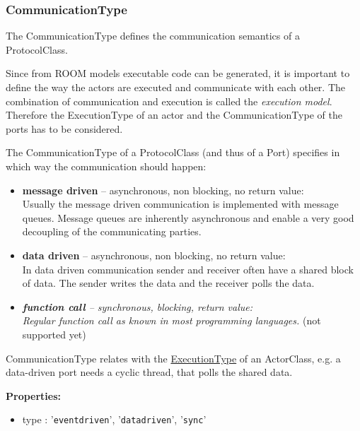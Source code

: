	
	\vspace{\baselineskip}
	\vspace{\baselineskip}
	\vspace{\baselineskip}
	
\subsubsection{CommunicationType}
	\hypertarget{ref:CommunicationType}{}
	The CommunicationType defines the communication semantics of a ProtocolClass.
		
	Since from ROOM models executable code can be generated, it is important to define the way the actors are 
	executed and communicate with each other. The combination of communication and execution is called the 
	\emph{execution model}. Therefore the ExecutionType of an actor and the CommunicationType of the ports has to be considered.
	
	The CommunicationType of a ProtocolClass (and thus of a Port) specifies in which way the communication should happen:
	
	\begin{itemize}
	\item \textbf{message driven} -- asynchronous, non blocking, no return value:\\
	Usually the message driven communication is implemented with message queues. Message queues are inherently asynchronous and enable a very good decoupling of the communicating parties.
	\item \textbf{data driven} -- asynchronous, non blocking, no return value:\\
	In data driven communication sender and receiver often have a shared block of data. The sender writes the data and the receiver polls the data.
	\item \textit{\textbf{function call} -- synchronous, blocking, return value:\\
	Regular function call as known in most programming languages.} (not supported yet)
	\end{itemize}
	
	CommunicationType relates with the \hyperlink{ref:ExecutionType}{ExecutionType} of an ActorClass, e.g. a data-driven port needs a cyclic thread, that polls the shared data.
		
	\textbf{Properties:}
	\begin{itemize}
	\item type : '\verb|eventdriven|', '\verb|datadriven|', '\verb|sync|'
	\end{itemize}
		
